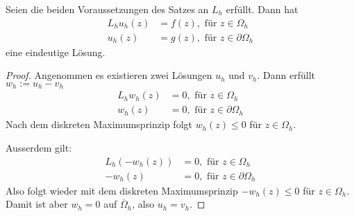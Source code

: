\begin{kor}
Seien die beiden Voraussetzungen des Satzes an $L_h$ erfüllt. Dann hat
\begin{align*}
L_h u_h( z) &= f(z), \text{ für } z \in \Omega_h \\
u_h(z) &= g(z), \text{ für } z \in \partial \Omega_h
\end{align*}
eine eindeutige Lösung.
\end{kor}
\begin{proof}
Angenommen es existieren zwei Lösungen $u_h$ und $v_h$. Dann erfüllt $w_h := u_h - v_h$
\begin{align*}
L_h w_h(z) &= 0, \text{ für } z \in \Omega_h \\
w_h(z) &= 0, \text{ für } z \in \partial \Omega_h
\end{align*}
Nach dem diskreten Maximumsprinzip folgt $w_h(z) \leq 0$ für $z \in \Omega_h$.

Ausserdem gilt:
\begin{align*}
L_h (-w_h(z)) &= 0, \text{ für } z \in \Omega_h \\
-w_h(z) &= 0, \text{ für } z \in \partial \Omega_h
\end{align*}
Also folgt wieder mit dem diskreten Maximumsprinzip $-w_h(z) \leq 0$ für $z \in \Omega_h$.
Damit ist aber $w_h = 0$ auf $\overline \Omega_h$, also $u_h = v_h$.
\end{proof}


